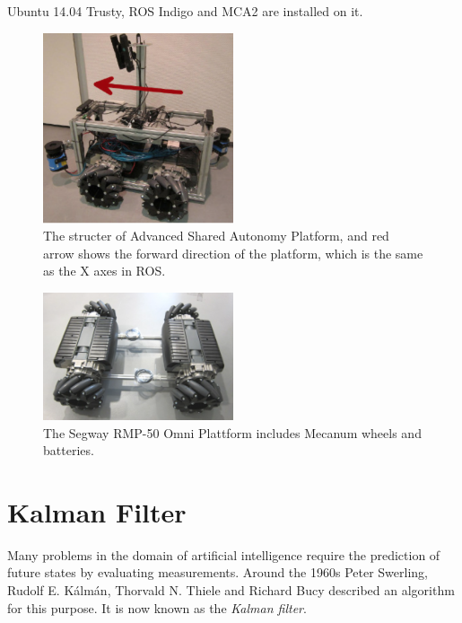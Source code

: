 Ubuntu 14.04 Trusty, ROS Indigo and MCA2 are installed on it.

\begin{figure}[ht]
      \centering
      \includegraphics[width=0.5\textwidth]{graphics/ASAP.png}
      \caption[Advanced Shared Autonomy Platform]{The structer of Advanced Shared Autonomy Platform, and red arrow shows the forward direction of the platform, which is the same as the X axes in ROS.}
      \label{ASAP}
   \end{figure}

\begin{figure}[ht]
      \centering
      \includegraphics[width=0.5\textwidth]{graphics/SegwayPlattform.png}
      \caption[Segway RMP-50 Omni Plattform]{The Segway RMP-50 Omni Plattform includes Mecanum wheels and batteries.}
      \label{Omni}
   \end{figure}

\section{Kalman Filter}
Many problems in the domain of artificial intelligence require the prediction of future states by evaluating measurements. Around the 1960s Peter Swerling, Rudolf E. Kálmán, Thorvald N. Thiele and Richard Bucy described an algorithm for this purpose. It is now known as the \textit{Kalman filter}.

